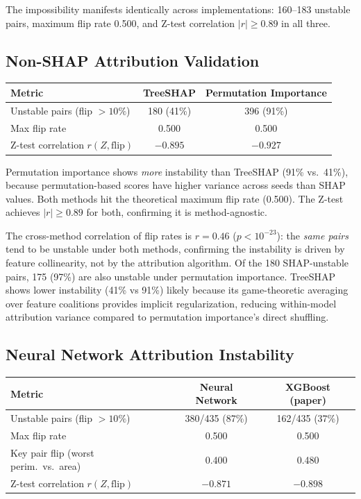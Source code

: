 \documentclass{jmlr}
\begin{document}
The impossibility manifests identically across implementations: 160--183 unstable pairs, maximum flip rate 0.500, and Z-test correlation $|r| \geq 0.89$ in all three.

\subsection{Non-SHAP Attribution Validation}

\begin{center}
\small
\begin{tabular}{@{}lcc@{}}
\toprule
Metric & TreeSHAP & Permutation Importance \\
\midrule
Unstable pairs (flip $>10\%$) & 180 (41\%) & 396 (91\%) \\
Max flip rate & 0.500 & 0.500 \\
Z-test correlation $r(Z, \text{flip})$ & $-0.895$ & $-0.927$ \\
\bottomrule
\end{tabular}
\end{center}

Permutation importance shows \emph{more} instability than TreeSHAP (91\% vs.\ 41\%), because permutation-based scores have higher variance across seeds than SHAP values. Both methods hit the theoretical maximum flip rate (0.500). The Z-test achieves $|r| \geq 0.89$ for both, confirming it is method-agnostic.

The cross-method correlation of flip rates is $r = 0.46$ ($p < 10^{-23}$): the \emph{same pairs} tend to be unstable under both methods, confirming the instability is driven by feature collinearity, not by the attribution algorithm. Of the 180 SHAP-unstable pairs, 175 (97\%) are also unstable under permutation importance. TreeSHAP shows lower instability (41\% vs 91\%) likely because its game-theoretic averaging over feature coalitions provides implicit regularization, reducing within-model attribution variance compared to permutation importance's direct shuffling.

\subsection{Neural Network Attribution Instability}

\begin{center}
\small
\begin{tabular}{@{}lcc@{}}
\toprule
Metric & Neural Network & XGBoost (paper) \\
\midrule
Unstable pairs (flip $> 10\%$) & 380/435 (87\%) & 162/435 (37\%) \\
Max flip rate & 0.500 & 0.500 \\
Key pair flip (worst perim.\ vs.\ area) & 0.400 & 0.480 \\
Z-test correlation $r(Z, \text{flip})$ & $-0.871$ & $-0.898$ \\
\bottomrule
\end{tabular}
\end{center}
\end{document}
